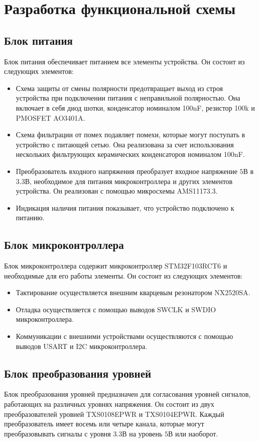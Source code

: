 \section{Разработка функциональной схемы}
\label{sec:func}

\subsection{Блок питания}
Блок питания обеспечивает питанием все элементы устройства. Он состоит из следующих элементов:
\begin{itemize}
    \item Схема защиты от смены полярности предотвращает выход из строя устройства при подключении питания с неправильной полярностью. Она включает в себя диод шотки, конденсатор номиналом 100nF, резистор 100k и PMOSFET AO3401A.
    \item Схема фильтрации от помех подавляет помехи, которые могут поступать в устройство с питающей сетью. Она реализована за счет использования нескольких фильтрующих керамических конденсаторов номиналом 100nF.
    \item Преобразователь входного напряжения преобразует входное напряжение $5 В$ в $3.3 В$, необходимое для питания микроконтроллера и других элементов устройства. Он реализован с помощью микросхемы AMS11173.3.
    \item Индикация наличия питания показывает, что устройство подключено к питанию.
\end{itemize}

\subsection{Блок микроконтроллера}
Блок микроконтроллера содержит микроконтроллер STM32F103RCT6 и необходимые для его работы элементы. Он состоит из следующих элементов:
\begin{itemize}
    \item Тактирование осуществляется внешним кварцевым резонатором NX2520SA.
    \item Отладка осуществляется с помощью выводов SWCLK и SWDIO микроконтроллера.
    \item Коммуникации с внешними устройствами осуществляются с помощью выводов USART и I2C микроконтроллера.
\end{itemize}

\subsection{Блок преобразования уровней} 

Блок преобразования уровней предназначен для согласования уровней сигналов, работающих на различных уровнях напряжения. Он состоит из двух преобразователей уровней TXS0108EPWR и TXS0104EPWR. Каждый преобразователь имеет восемь или четыре канала, которые могут преобразовывать сигналы с уровня $3.3 В$ на уровень $5 В$ или наоборот.
